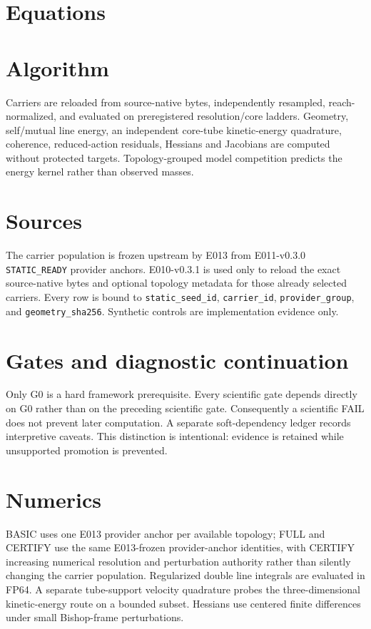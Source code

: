 \documentclass[11pt]{article}
\begin{document}
\section{Equations}


\section{Algorithm}
Carriers are reloaded from source-native bytes, independently resampled, reach-normalized, and evaluated on preregistered resolution/core ladders. Geometry, self/mutual line energy, an independent core-tube kinetic-energy quadrature, coherence, reduced-action residuals, Hessians and Jacobians are computed without protected targets. Topology-grouped model competition predicts the energy kernel rather than observed masses.

\section{Sources}
The carrier population is frozen upstream by E013 from E011-v0.3.0 \texttt{STATIC\_READY} provider anchors. E010-v0.3.1 is used only to reload the exact source-native bytes and optional topology metadata for those already selected carriers. Every row is bound to \texttt{static\_seed\_id}, \texttt{carrier\_id}, \texttt{provider\_group}, and \texttt{geometry\_sha256}. Synthetic controls are implementation evidence only.

\section{Gates and diagnostic continuation}
Only G0 is a hard framework prerequisite. Every scientific gate depends directly on G0 rather than on the preceding scientific gate. Consequently a scientific FAIL does not prevent later computation. A separate soft-dependency ledger records interpretive caveats. This distinction is intentional: evidence is retained while unsupported promotion is prevented.

\section{Numerics}
BASIC uses one E013 provider anchor per available topology; FULL and CERTIFY use the same E013-frozen provider-anchor identities, with CERTIFY increasing numerical resolution and perturbation authority rather than silently changing the carrier population. Regularized double line integrals are evaluated in FP64. A separate tube-support velocity quadrature probes the three-dimensional kinetic-energy route on a bounded subset. Hessians use centered finite differences under small Bishop-frame perturbations.
\end{document}
